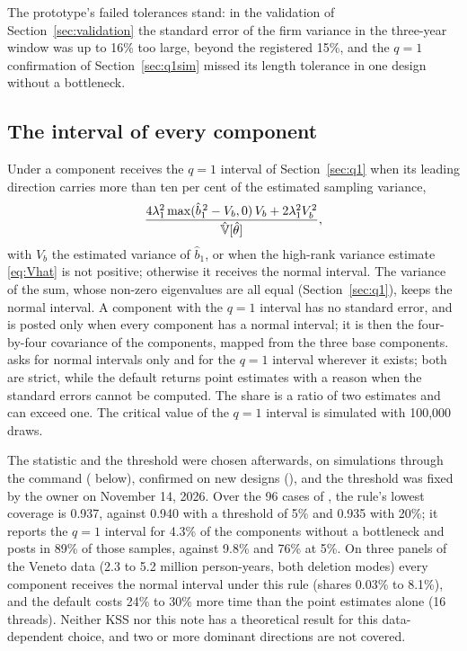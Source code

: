 The prototype's failed tolerances stand: in the validation of Section~\ref{sec:validation} the standard error of the
firm variance in the three-year window was up to 16\% too large, beyond the registered 15\%, and the $q=1$
confirmation of Section~\ref{sec:q1sim} missed its length tolerance in one design without a bottleneck.

\subsection{The interval of every component}\label{sec:impl-rule}

Under  a component receives the $q=1$ interval of Section~\ref{sec:q1} when its leading
direction carries more than ten per cent of the estimated sampling variance,
\[
\frac{4\lambda_1^2\max(\hat b_1^{\,2}-V_b,0)\,V_b+2\lambda_1^2V_b^2}{\hat{\mathbb{V}}[\hat\theta]},
\]
with $V_b$ the estimated variance of $\hat b_1$, or when the high-rank variance estimate \eqref{eq:Vhat} is not
positive; otherwise it receives the normal interval. The variance of the sum, whose non-zero eigenvalues are all
equal (Section~\ref{sec:q1}), keeps the normal interval. A component with the $q=1$ interval has no standard error,
and  is posted only when every component has a normal interval; it is then the four-by-four covariance
of the components, mapped from the three base components.  asks for normal intervals
only and  for the $q=1$ interval wherever it exists; both are strict, while the default
returns point estimates with a reason when the standard errors cannot be computed. The share is a ratio of two
estimates and can exceed one. The critical value of the $q=1$ interval is simulated with 100{,}000 draws.

The statistic and the threshold were chosen afterwards, on simulations through the command ( below),
confirmed on new designs (), and the threshold was fixed by the owner on November 14, 2026. Over the
96 cases of , the rule's lowest coverage is 0.937, against 0.940 with a threshold of 5\% and 0.935 with
20\%; it reports the $q=1$ interval for 4.3\% of the components without a bottleneck and posts  in 89\%
of those samples, against 9.8\% and 76\% at 5\%. On three panels of the Veneto data (2.3 to 5.2 million
person-years, both deletion modes) every component receives the normal interval under this rule (shares 0.03\% to
8.1\%), and the default costs 24\% to 30\% more time than the point estimates alone (16 threads). Neither KSS nor
this note has a theoretical result for this data-dependent choice, and two or more dominant directions are not
covered.

